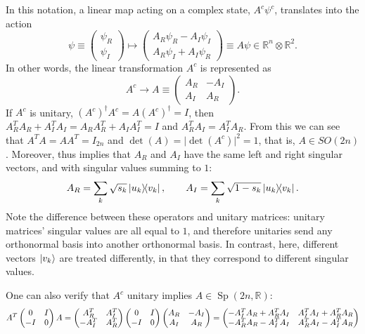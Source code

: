 \documentclass[12pt]{report}
\newcommand{\RR}{\mathbb{R}}
\newcommand{\on}[1]{\operatorname{#1}}
\begin{document}
In this notation, a linear map acting on a complex state, $A^c\psi^c$, translates into the action
\begin{equation}
	\psi\equiv \begin{pmatrix}
		\psi_R \\ \psi_I
	\end{pmatrix}
	\mapsto
	\begin{pmatrix}
		A_R \psi_R - A_I \psi_I \\
		A_R \psi_I + A_I \psi_R
	\end{pmatrix} \equiv A\psi \in \RR^n\otimes\RR^2.
\end{equation}
In other words, the linear transformation $A^c$ is represented as
\begin{equation}
	A^c \to A \equiv \begin{pmatrix}
		A_R & -A_I \\ A_I & A_R
	\end{pmatrix}.
\end{equation}
If $A^c$ is unitary, $(A^c)^\dagger A^c=A(A^c)^\dagger=I$, then $A_R^T A_R+A_I^T A_I = A_R A_R^T+A_I A_I^T = I$ and $A_R^T A_I = A_I^T A_R$.
From this we can see that $A^T A=AA^T=I_{2n}$ and $\det(A)=\lvert\det(A^c)\rvert^2=1$, that is, $A\in SO(2n)$.
Moreover, thus implies that $A_R$ and $A_I$ have the same left and right singular vectors, and with singular values summing to $1$:
\begin{equation}
	A_R = \sum_k \sqrt{s_k} \ketbra{u_k}{v_k},
	\qquad
	A_I = \sum_k \sqrt{1-s_k} \ketbra{u_k}{v_k}.
\end{equation}
Note the difference between these operators and unitary matrices: unitary matrices' singular values are all equal to $1$, and therefore unitaries send any orthonormal basis into another orthonormal basis. In contrast, here, different vectors $\ket{v_k}$ are treated differently, in that they correspond to different singular values.

One can also verify that $A^c$ unitary implies $A\in \on{Sp}(2n,\RR)$:
\begin{equation}\scalebox{0.9}{$\displaystyle
	A^T \begin{pmatrix}
		0 & I \\ -I & 0
	\end{pmatrix} A
	= \begin{pmatrix}
		A_R^T & A_I^T \\ -A_I^T & A_R^T
	\end{pmatrix}
	\begin{pmatrix}
		0 & I \\ -I & 0
	\end{pmatrix}
	\begin{pmatrix}
		A_R & -A_I \\ A_I & A_R
	\end{pmatrix} =
	\begin{pmatrix}
		-A_I^T A_R + A_R^T A_I & A_I^T A_I + A_R^T A_R \\
		-A_R^T A_R - A_I^T A_I & A_R^T A_I - A_I^T A_R
	\end{pmatrix}
$}\end{equation}
\end{document}
